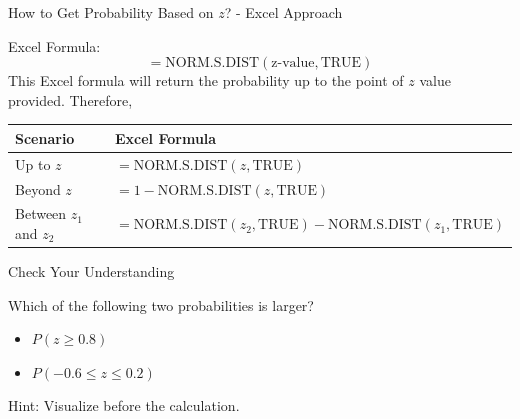 \documentclass{beamer}
\begin{document}
\begin{frame}{How to Get Probability Based on $z$? - Excel Approach}

Excel Formula:
$$ = \text{NORM.S.DIST}(\text{z-value}, \text{TRUE})$$
This Excel formula will return the probability up to the point of $z$ value provided. Therefore, 

\begin{small}
\begin{center}
\begin{table}[]


\begin{tabular}{l|l}

\hline
Scenario                & Excel Formula \\ \hline
Up to $z$               & $ = \text{NORM.S.DIST} (z, \text{TRUE}) $ \\ \hline
Beyond $z$              & $ = 1- \text{NORM.S.DIST} (z, \text{TRUE}) $ \\ \hline
Between $z_1$ and $z_2$ & $ = \text{NORM.S.DIST} (z_2, \text{TRUE}) - \text{NORM.S.DIST} (z_1, \text{TRUE})  $ \\ \hline

\end{tabular}
\end{table}
\end{center}

\end{small}

\end{frame}



\begin{frame}{Check Your Understanding}

Which of the following two probabilities is larger? 

\begin{itemize}
\item $P(z \geq 0.8)$
\item $P(-0.6 \leq z \leq 0.2) $
\end{itemize}

Hint: Visualize before the calculation. 

\end{frame}
\end{document}

